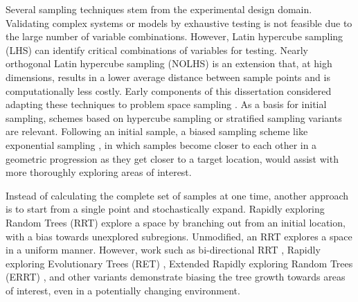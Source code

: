 Several sampling techniques stem from the experimental design domain.   Validating complex systems or models by exhaustive testing is not feasible due to the large number of variable combinations.  However, Latin hypercube sampling (LHS) can identify critical combinations of variables for testing.   Nearly orthogonal Latin hypercube sampling (NOLHS) \citep{cioppa2002orthogonal}  is an extension that, at high dimensions, results in a lower average distance between sample points and is computationally less costly.  Early components of this dissertation considered adapting these techniques to problem space sampling \citep{holder08improving}.  As a basis for initial sampling, schemes based on hypercube sampling \citep{mckay79comparison, ye00algorithmic, cioppa2002orthogonal} or stratified sampling variants \citep{mckay79comparison, kwok2006semistatic} are relevant.  Following an initial sample, a biased sampling scheme like exponential sampling \citep{holder06company}, in which samples become closer to each other in a geometric progression as they get closer to a target location, would assist with more thoroughly exploring areas of interest.

Instead of calculating the complete set of samples at one time, another approach is to start from a single point and stochastically expand.  Rapidly exploring Random Trees (RRT) explore a space by branching out from an initial location, with a bias towards unexplored subregions.  Unmodified, an RRT explores a space in a uniform manner.  However, work such as bi-directional RRT  \citep{lavalle01randomized}, Rapidly exploring Evolutionary Trees (RET) \citep{martin09offline}, Extended Rapidly exploring Random Trees (ERRT) \citep{bruce02real-time}, and other variants \citep{zucker07multipartite, ferguson06replanning} demonstrate biasing the tree growth towards areas of interest, even in a potentially changing environment.  %




